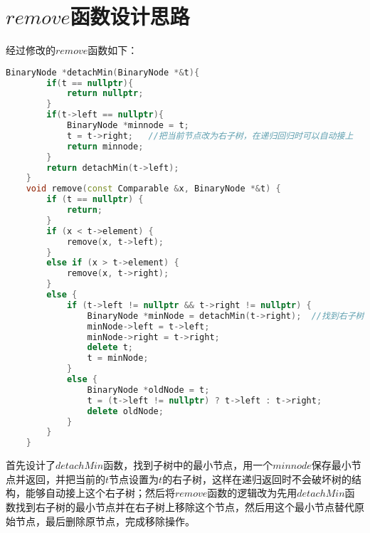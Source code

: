 \documentclass[UTF8]{ctexart}
\begin{document}
\pagestyle{fancy}
\fancyhead{}

\section{$remove$函数设计思路}
经过修改的$remove$函数如下：
\begin{lstlisting}[language=c++]
    BinaryNode *detachMin(BinaryNode *&t){
        if(t == nullptr){
            return nullptr;
        }
        if(t->left == nullptr){
            BinaryNode *minnode = t;
            t = t->right;   //把当前节点改为右子树，在递归回归时可以自动接上
            return minnode;
        }
        return detachMin(t->left);
    }
    void remove(const Comparable &x, BinaryNode *&t) {
        if (t == nullptr) {
            return;  
        }
        if (x < t->element) {
            remove(x, t->left);
        } 
        else if (x > t->element) {
            remove(x, t->right);
        } 
        else {  
            if (t->left != nullptr && t->right != nullptr) {  
                BinaryNode *minNode = detachMin(t->right);  //找到右子树最小节点并移除，然后替代
                minNode->left = t->left;  
                minNode->right = t->right;  
                delete t;  
                t = minNode;  
            } 
            else {  
                BinaryNode *oldNode = t;
                t = (t->left != nullptr) ? t->left : t->right;  
                delete oldNode;
            }
        }
    }
\end{lstlisting}\par
首先设计了$detachMin$函数，找到子树中的最小节点，用一个$minnode$保存最小节点并返回，并把当前的$t$节点设置为$t$的右子树，这样在递归返回时不会破坏树的结构，能够自动接上这个右子树；然后将$remove$函数的逻辑改为先用$detachMin$函数找到右子树的最小节点并在右子树上移除这个节点，然后用这个最小节点替代原始节点，最后删除原节点，完成移除操作。
\end{document}
